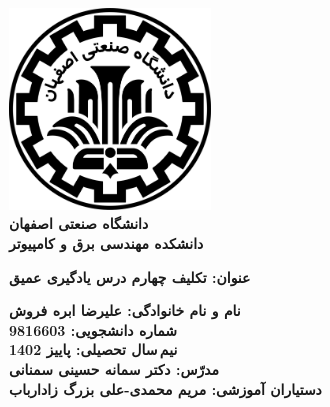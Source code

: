 \begin{titlepage}
\begin{center}
\includegraphics[width=0.4\textwidth]{figures/IUT Logo.png}\\
        
\LARGE
\textbf{دانشگاه صنعتی اصفهان}\\
\textbf{دانشکده مهندسی برق و کامپیوتر}\\
        
\vfill
        
\huge
\textbf{عنوان: تکلیف چهارم درس یادگیری عمیق}\\
        
\vfill
        
\LARGE
\textbf{نام و نام خانوادگی: علیرضا ابره فروش}\\
\textbf{شماره دانشجویی: 9816603}\\
\textbf{نیم\,سال تحصیلی: پاییز 1402}\\
\textbf{مدرّس: دکتر سمانه حسینی سمنانی}\\
\textbf{دستیاران آموزشی: مریم محمدی-علی بزرگ زادارباب}\\
\end{center}
\end{titlepage}
